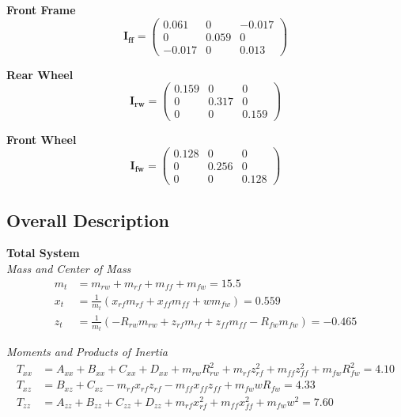 \documentclass[a4paper]{article}
\begin{document}
\noindent \textbf{Front Frame} \\
\begin{equation*}
\mathbf{I_{ff}} = \begin{pmatrix}
0.061 & 0 & -0.017 \\
0 & 0.059 & 0 \\
-0.017 & 0 & 0.013
\end{pmatrix}
\end{equation*}

\noindent \textbf{Rear Wheel} \\
\begin{equation*}
\mathbf{I_{rw}} = \begin{pmatrix}
0.159 & 0 & 0 \\
0 & 0.317 & 0 \\
0 & 0 & 0.159
\end{pmatrix}
\end{equation*}

\noindent \textbf{Front Wheel} \\
\begin{equation*}
\mathbf{I_{fw}} = \begin{pmatrix}
0.128 & 0 & 0 \\
0 & 0.256 & 0 \\
0 & 0 & 0.128
\end{pmatrix}
\end{equation*}

\subsection{Overall Description}

\textbf{Total System} \\

\noindent \textit{Mass and Center of Mass}
\begin{align}
m_t &= m_{rw} + m_{rf} + m_{ff} + m_{fw} = 15.5 \\
x_t &= \frac{1}{m_t} (x_{rf} m_{rf} + x_{ff} m_{ff} + w m_{fw}) = 0.559 \\
z_t &= \frac{1}{m_t} (-R_{rw} m_{rw} + z_{rf} m_{rf} + z_{ff} m_{ff} - R_{fw} m_{fw}) = -0.465
\end{align}

\noindent \textit{Moments and Products of Inertia}
\begin{align}
T_{xx} &= A_{xx} + B_{xx} + C_{xx} + D_{xx} + m_{rw} R^2_{rw} + m_{rf} z^2_{rf} + m_{ff} z^2_{ff} + m_{fw} R^2_{fw} = 4.10 \\
T_{xz} &= B_{xz} + C_{xz} - m_{rf} x_{rf} z_{rf} - m_{ff} x_{ff} z_{ff} + m_{fw} w R_{fw} = 4.33 \\
T_{zz} &= A_{zz} + B_{zz} + C_{zz} + D_{zz} + m_{rf} x^2_{rf} + m_{ff} x^2_{ff} + m_{fw} w^2 = 7.60
\end{align}
\end{document}
